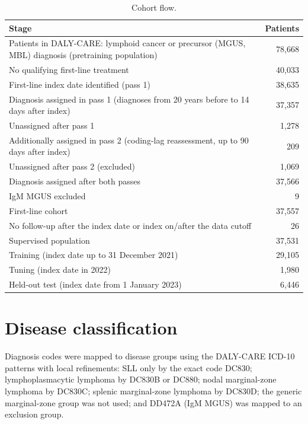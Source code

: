 \documentclass[10pt]{article}
\begin{document}
\begin{table}[ht]
\centering\footnotesize
\caption{Cohort flow.}\label{tab:flow}
\begin{tabular}{L{11cm}r}
\toprule
Stage & Patients\\
\midrule
Patients in DALY-CARE: lymphoid cancer or precursor (MGUS, MBL) diagnosis (pretraining population) & 78,668\\
\quad No qualifying first-line treatment & 40,033\\
First-line index date identified (pass 1) & 38,635\\
\quad Diagnosis assigned in pass 1 (diagnoses from 20 years before to 14 days after index) & 37,357\\
\quad Unassigned after pass 1 & 1,278\\
\quad Additionally assigned in pass 2 (coding-lag reassessment, up to 90 days after index) & 209\\
\quad Unassigned after pass 2 (excluded) & 1,069\\
Diagnosis assigned after both passes & 37,566\\
\quad IgM MGUS excluded & 9\\
First-line cohort & 37,557\\
\quad No follow-up after the index date or index on/after the data cutoff & 26\\
Supervised population & 37,531\\
\quad Training (index date up to 31 December 2021) & 29,105\\
\quad Tuning (index date in 2022) & 1,980\\
\quad Held-out test (index date from 1 January 2023) & 6,446\\
\bottomrule
\end{tabular}
\end{table}

\section{Disease classification}\label{sec:disease}

Diagnosis codes were mapped to disease groups using the DALY-CARE ICD-10
patterns with local refinements: SLL only by the exact code DC830;
lymphoplasmacytic lymphoma by DC830B or DC880; nodal marginal-zone lymphoma by
DC830C; splenic marginal-zone lymphoma by DC830D; the generic marginal-zone
group was not used; and DD472A (IgM MGUS) was mapped to an exclusion group.
\end{document}
